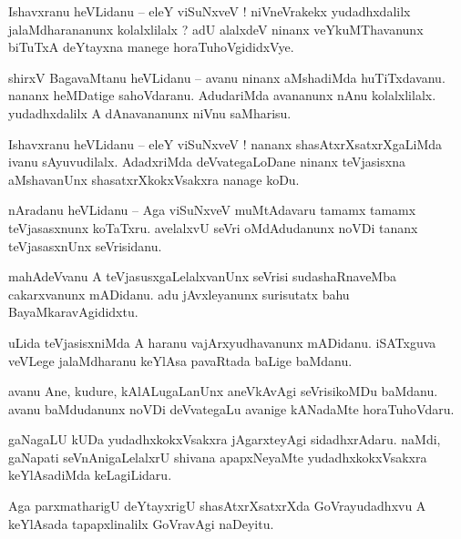 \documentclass{article}
\begin{document}
\begin{mn}%
Ishavxranu heVLidanu -- eleY viSuNxveV ! niVneVrakekx yudadhxdalilx jalaMdharananunx kolalxlilalx ? 
adU alalxdeV ninanx veYkuMThavanunx biTuTxA deYtayxna manege horaTuhoVgididxVye.
\end{mn}

\begin{mn}%
shirxV BagavaMtanu heVLidanu -- avanu ninanx aMshadiMda huTiTxdavanu. nananx heMDatige sahoVdaranu. 
AdudariMda avananunx nAnu kolalxlilalx. yudadhxdalilx A dAnavananunx niVnu saMharisu.
\end{mn}

\begin{mn}%
Ishavxranu heVLidanu -- eleY viSuNxveV ! nananx shasAtxrXsatxrXgaLiMda ivanu sAyuvudilalx. 
AdadxriMda deVvategaLoDane ninanx teVjasisxna aMshavanUnx shasatxrXkokxVsakxra nanage koDu.
\end{mn}

\begin{mn}%
nAradanu heVLidanu -- Aga viSuNxveV muMtAdavaru tamamx tamamx teVjasasxnunx koTaTxru. avelalxvU 
seVri oMdAdudanunx noVDi tananx teVjasasxnUnx seVrisidanu.
\end{mn}

\begin{mn}%
mahAdeVvanu A teVjasusxgaLelalxvanUnx seVrisi sudashaRnaveMba cakarxvanunx mADidanu. adu 
jAvxleyanunx surisutatx bahu BayaMkaravAgididxtu.
\end{mn}

\begin{mn}%
uLida teVjasisxniMda A haranu vajArxyudhavanunx mADidanu. iSATxguva veVLege jalaMdharanu keYlAsa 
pavaRtada baLige baMdanu.
\end{mn}

\begin{mn}%
avanu Ane, kudure, kAlALugaLanUnx aneVkAvAgi seVrisikoMDu baMdanu. avanu baMdudanunx noVDi 
deVvategaLu avanige kANadaMte horaTuhoVdaru.
\end{mn}

\begin{mn}%
gaNagaLU kUDa yudadhxkokxVsakxra jAgarxteyAgi sidadhxrAdaru. naMdi, gaNapati seVnAnigaLelalxrU 
shivana apapxNeyaMte yudadhxkokxVsakxra keYlAsadiMda keLagiLidaru.
\end{mn}

\begin{mn}%
Aga parxmatharigU deYtayxrigU shasAtxrXsatxrXda GoVrayudadhxvu A keYlAsada tapapxlinalilx GoVravAgi 
naDeyitu.
\end{mn}
\end{document}

